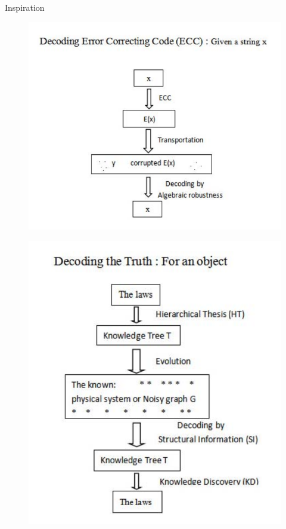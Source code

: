 \documentclass[t,aspectratio=169,usepdftitle=false]{beamer}
\begin{document}
  \begin{frame}{Inspiration}
    \begin{minipage}[c]{0.45\linewidth}
      \begin{figure}
        \centering
        \includegraphics[width=0.9\linewidth]{./figures/FIG5.PNG}
      \end{figure}
    \end{minipage}
    \hfill
    \begin{minipage}[c]{0.45\linewidth}
      \begin{figure}
        \centering
        \includegraphics[width=0.8\linewidth]{./figures/FIG6.PNG}
      \end{figure}
    \end{minipage}
  \end{frame}
\end{document}
